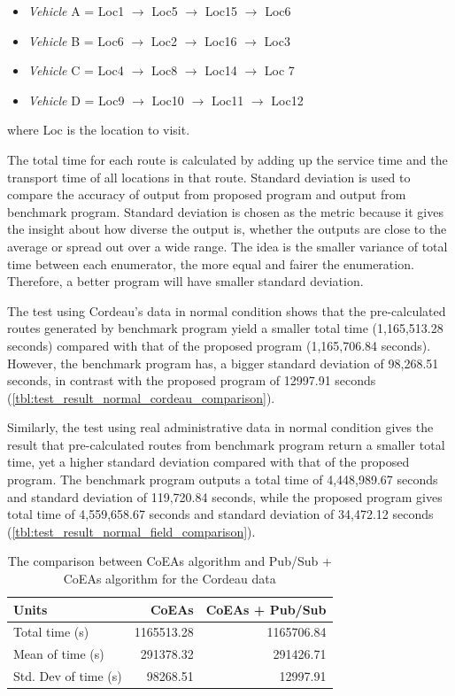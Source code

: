 \documentclass[conference]{IEEEtran}
\newcommand{\ra}[1]{\renewcommand{\arraystretch}{#1}}
\begin{document}
\begin{itemize}
\item \textit{Vehicle} A = Loc1 $\rightarrow$ Loc5 $\rightarrow$ Loc15 $\rightarrow$ Loc6
\item \textit{Vehicle} B = Loc6 $\rightarrow$ Loc2 $\rightarrow$ Loc16 $\rightarrow$ Loc3
\item \textit{Vehicle} C = Loc4 $\rightarrow$ Loc8 $\rightarrow$ Loc14 $\rightarrow$ Loc 7
\item \textit{Vehicle} D = Loc9 $\rightarrow$ Loc10 $\rightarrow$ Loc11 $\rightarrow$ Loc12
\end{itemize}
where Loc is the location to visit. 

The total time for each route is calculated by adding up the service time and the transport time of all locations in that route. Standard deviation is used to compare the accuracy of output from proposed program and output from benchmark program. Standard deviation is chosen as the metric because it gives the insight about how diverse the output is, whether the outputs are close to the average or spread out over a wide range. The idea is the smaller variance of total time between each enumerator, the more equal and fairer the enumeration. Therefore, a better program will have smaller standard deviation.

The test using Cordeau's data in normal condition shows that the pre-calculated routes generated by benchmark program yield a smaller total time (1,165,513.28 seconds) compared with that of the proposed program (1,165,706.84 seconds). However, the benchmark program has, a bigger standard deviation of 98,268.51 seconds, in contrast with the proposed program of 12997.91 seconds (\autoref{tbl:test_result_normal_cordeau_comparison}). 

Similarly, the test using real administrative data in normal condition gives the result that pre-calculated routes from benchmark program return a smaller total time, yet a higher standard deviation compared with that of the proposed program. The benchmark program outputs a total time of 4,448,989.67 seconds and standard deviation of 119,720.84 seconds, while the proposed program gives total time of 4,559,658.67 seconds and standard deviation of 34,472.12 seconds (\autoref{tbl:test_result_normal_field_comparison}).


\begin{table}
	\centering
	\ra{1.3}
	\caption{The comparison between CoEAs algorithm and Pub/Sub + CoEAs algorithm for the Cordeau data}
	\label{tbl:test_result_normal_cordeau_comparison}
	\begin{tabular}{lrr}
		\toprule
		Units & CoEAs & CoEAs + Pub/Sub\\ 
		\midrule
		Total time (s) & 1165513.28 & 1165706.84\\
		Mean of time (s) & 291378.32 & 291426.71\\
		Std. Dev of time (s) & 98268.51 & 12997.91\\
		\bottomrule
	\end{tabular}
\end{table}
\end{document}

